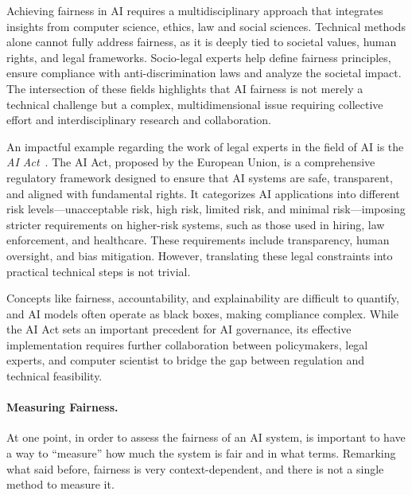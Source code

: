 \documentclass[12pt,a4paper,openright,twoside]{book}
\begin{document}

Achieving fairness in \ac{AI} requires a multidisciplinary approach that integrates insights from computer science, ethics, law and social sciences.
%
Technical methods alone cannot fully address fairness, as it is deeply tied to societal values, human rights, and legal frameworks.
%
Socio-legal experts help define fairness principles, ensure compliance with anti-discrimination laws and analyze the societal impact.
%
The intersection of these fields highlights that \ac{AI} fairness is not merely a technical challenge but a complex, multidimensional issue requiring collective effort and interdisciplinary research and collaboration.


An impactful example regarding the work of legal experts in the field of \acl{AI} is the \textit{AI Act}~\cite{madiega2021artificial}.
%
The AI Act, proposed by the European Union, is a comprehensive regulatory framework designed to ensure that AI systems are safe, transparent, and aligned with fundamental rights.
%
It categorizes AI applications into different risk levels—unacceptable risk, high risk, limited risk, and minimal risk—imposing stricter requirements on higher-risk systems, such as those used in hiring, law enforcement, and healthcare.
%
These requirements include transparency, human oversight, and bias mitigation.
%
However, translating these legal constraints into practical technical steps is not trivial.

Concepts like fairness, accountability, and explainability are difficult to quantify, and AI models often operate as black boxes, making compliance complex.
%
While the AI Act sets an important precedent for AI governance, its effective implementation requires further collaboration between policymakers, legal experts, and computer scientist to bridge the gap between regulation and technical feasibility.


\paragraph{Measuring Fairness.}

At one point, in order to assess the fairness of an \ac{AI} system, is important to have a way to ``measure'' how much the system is fair and in what terms.
%
Remarking what said before, fairness is very context-dependent, and there is not a single method to measure it. 
\end{document}
